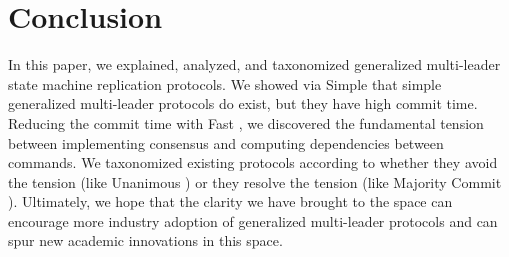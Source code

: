 \section{Conclusion}
In this paper, we explained, analyzed, and taxonomized generalized multi-leader
state machine replication protocols. We showed via Simple \BPaxos{} that simple
generalized multi-leader protocols do exist, but they have high commit time.
Reducing the commit time with Fast \BPaxos{}, we discovered the fundamental
tension between implementing consensus and computing dependencies between
commands. We taxonomized existing protocols according to whether they avoid the
tension (like Unanimous \BPaxos{}) or they resolve the tension (like Majority
Commit \BPaxos{}). Ultimately, we hope that the clarity we have brought to the
space can encourage more industry adoption of generalized multi-leader
protocols and can spur new academic innovations in this space.
